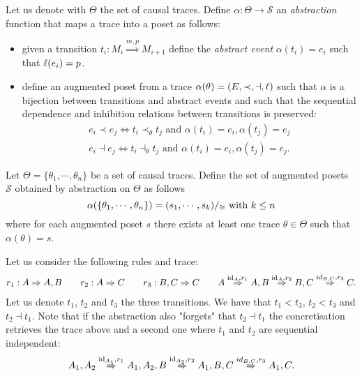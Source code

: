 \begin{definition}
  \label{def:abstraction}
  Let us denote with $\Theta$ the set of causal traces.
  Define $\alpha:\Theta\to\mathcal{S}$ an \emph{abstraction} function that maps a trace into a poset as follows:
  \begin{itemize}
  \item given a transition $t_i:M_i\overset{m,p}{\Rightarrow} M_{i+1}$ define the \emph{abstract event} $\alpha(t_i) = e_i$ such that $\ell(e_i) = p$.
  \item define an augmented poset from a trace $\alpha(\theta) = (E,\prec,\dashv,\ell)$ such that $\alpha$ is a bijection between transitions and abstract events and such that the sequential dependence and inhibition relations between transitions is preserved:
    \begin{align*}
      e_i \prec e_j \iff t_i \prec_{\theta} t_j \text{ and } \alpha(t_i)=e_i, \alpha(t_j)=e_j\\
      e_i \dashv e_j \iff t_i \dashv_{\theta} t_j \text{ and } \alpha(t_i)=e_i, \alpha(t_j)=e_j.
    \end{align*}
  \end{itemize}
  Let $\Theta = \{\theta_1,\cdots,\theta_n\}$ be a set of causal traces.
  Define the set of augmented posets $\mathcal{S}$ obtained by abstraction on $\Theta$ as follows
  \[
  \alpha(\{\theta_1,\cdots,\theta_n\}) = (s_1,\cdots, s_k)/_{\cong}\text{ with }k\leq n
  \]
  where for each augmented poset $s$ there exists at least one trace $\theta\in\Theta$ such that $\alpha(\theta) = s$.
\end{definition}

\begin{example}
  Let us consider the following rules and trace:
  \begin{align*}
    r_1:A \Rightarrow A, B\qquad r_2:A \Rightarrow C \qquad r_3: B,C \Rightarrow C\qquad
    A \overset{\text{id}_A,r_1}{\Rightarrow} A, B \overset{\text{id}_A,r_2}{\Rightarrow} B,C \overset{id_{B,C},r_3}{\Rightarrow}C.
  \end{align*}
  Let us denote $t_1$, $t_2$ and $t_3$ the three transitions. We have that $t_1<t_3$, $t_2<t_3$ and $t_2\dashv t_1$.
  Note that if the abstraction also "forgets" that $t_2\dashv t_1$ the concretisation retrieves the trace above and a second one where $t_1$ and $t_2$ are sequential independent:
  \begin{align*}
    A_1,A_2 \overset{\text{id}_{A_1},r_1}{\Rightarrow} A_1,A_2,B \overset{\text{id}_{A_2},r_2}{\Rightarrow} A_1,B,C \overset{id_{B,C},r_3}{\Rightarrow} A_1,C.
  \end{align*}
\end{example}

